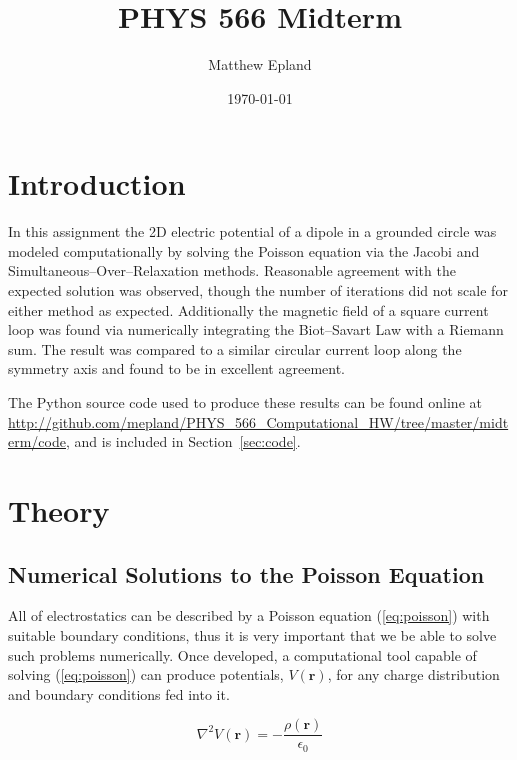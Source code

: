 \documentclass[notitlepage,aps,prd,nofootinbib]{revtex4-1}
\begin{document}
\title{PHYS 566 Midterm}
\author{Matthew Epland}

\date{\today}

\begin{abstract}
\end{abstract}\maketitle

\section{Introduction}
\label{sec:intro}
In this assignment the 2D electric potential of a dipole in a grounded circle was modeled computationally by solving the Poisson equation via the Jacobi and Simultaneous--Over--Relaxation methods. Reasonable agreement with the expected solution was observed, though the number of iterations did not scale for either method as expected. Additionally the magnetic field of a square current loop was found via numerically integrating the Biot--Savart Law with a Riemann sum. The result was compared to a similar circular current loop along the symmetry axis and found to be in excellent agreement. 

The Python source code used to produce these results can be found online at \url{http://github.com/mepland/PHYS_566_Computational_HW/tree/master/midterm/code}, and is included in Section~\ref{sec:code}.

\section{Theory}
\label{sec:theory}

\subsection{Numerical Solutions to the Poisson Equation}
\label{subsec:poisson_theory}
All of electrostatics can be described by a Poisson equation (\ref{eq:poisson}) with suitable boundary conditions, thus it is very important that we be able to solve such problems numerically. Once developed, a computational tool capable of solving (\ref{eq:poisson}) can produce potentials, $V\left(\mathbf{r}\right)$, for any charge distribution and boundary conditions fed into it.

\begin{equation} \label{eq:poisson}
\nabla^{2} V\left(\mathbf{r}\right) = -\frac{\rho\left(\mathbf{r}\right)}{\epsilon_{0}}
\end{equation}
\end{document}
